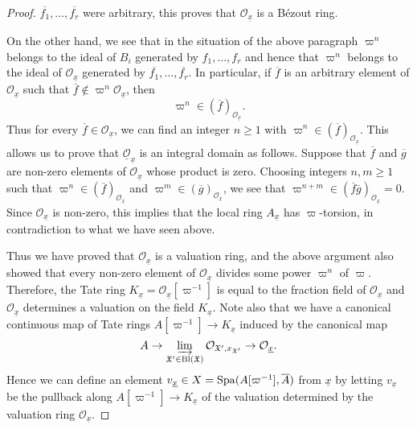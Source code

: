 \documentclass[12pt,twoside,a4paper]{article}
\theoremstyle{definition}
\theoremstyle{remark}
\newcommand\Bl{{\rm Bl}}
\newcommand\Spa{{\rm Spa}}
\begin{document}
\begin{proof}
$\overline{f_1},\dots, \overline{f_r}$ were arbitrary, this proves that $\mathcal{O}_{\underline{x}}$ is a Bézout ring. 

On the other hand, we see that in the situation of the above paragraph $\varpi^{n}$ belongs to the ideal of $B_{i}$ generated by $f_1,\dots, f_r$ and hence that $\varpi^{n}$ belongs to the ideal of $\mathcal{O}_{\underline{x}}$ generated by $\overline{f_1},\dots, \overline{f_r}$. In particular, if $\overline{f}$ is an arbitrary element of $\mathcal{O}_{\underline{x}}$ such that $\overline{f}\not\in \varpi^{n}\mathcal{O}_{\underline{x}}$, then \begin{equation*}\varpi^{n}\in (\overline{f})_{\mathcal{O}_{\underline{x}}}.\end{equation*}Thus for every $\overline{f}\in \mathcal{O}_{\underline{x}}$, we can find an integer $n\geq1$ with $\varpi^{n}\in (\overline{f})_{\mathcal{O}_{\underline{x}}}$. This allows us to prove that $\underline{\mathcal{O}}_{\underline{x}}$ is an integral domain as follows. Suppose that $\overline{f}$ and $\overline{g}$ are non-zero elements of $\mathcal{O}_{\underline{x}}$ whose product is zero. Choosing integers $n, m\geq 1$ such that $\varpi^{n}\in (\overline{f})_{\mathcal{O}_{\underline{x}}}$ and $\varpi^{m}\in (\overline{g})_{\mathcal{O}_{\underline{x}}}$, we see that $\varpi^{n+m}\in (\overline{f}\overline{g})_{\mathcal{O}_{\underline{x}}}=0$. Since $\mathcal{O}_{\underline{x}}$ is non-zero, this implies that the local ring $A_{\underline{x}}$ has $\varpi$-torsion, in contradiction to what we have seen above.

Thus we have proved that $\mathcal{O}_{\underline{x}}$ is a valuation ring, and the above argument also showed that every non-zero element of $\mathcal{O}_{\underline{x}}$ divides some power $\varpi^{n}$ of $\varpi$. Therefore, the Tate ring $K_{\underline{x}}=\mathcal{O}_{\underline{x}}[\varpi^{-1}]$ is equal to the fraction field of $\mathcal{O}_{\underline{x}}$ and $\mathcal{O}_{\underline{x}}$ determines a valuation on the field $K_{\underline{x}}$. Note also that we have a canonical continuous map of Tate rings $A[\varpi^{-1}]\to K_{\underline{x}}$ induced by the canonical map \begin{equation*}A\to \varinjlim_{\mathfrak{X}'\in\Bl(\mathfrak{X})}\mathcal{O}_{\mathfrak{X}', x_{\mathfrak{X}'}}\to \mathcal{O}_{\underline{x}}.\end{equation*}Hence we can define an element $v_{\underline{x}}\in X=\Spa(A[\varpi^{-1}], \overline{A})$ from $\underline{x}$ by letting $v_{\underline{x}}$ be the pullback along $A[\varpi^{-1}]\to K_{\underline{x}}$ of the valuation determined by the valuation ring $\mathcal{O}_{\underline{x}}$. 


\end{proof}
\end{document}
